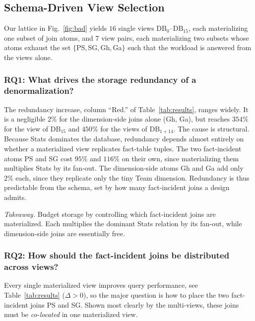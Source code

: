 \documentclass[sigconf]{acmart}
\begin{document}
\subsection{Schema-Driven View Selection}
\label{sec:exp:analysis}

Our lattice in Fig.~\ref{fig:bad} yields $16$ single views $\mathrm{DB}_0$--$\mathrm{DB}_{15}$, each materializing one subset of join atoms, and $7$ view pairs, each materializing two subsets whose atoms exhaust the set $\{$PS,\,SG,\,Gh,\,Ga$\}$ such that the workload is answered from the views alone.

\subsubsection{RQ1: What drives the storage redundancy of a denormalization?}
\label{sec:exp:rq1}
The redundancy increase, column ``Red.'' of Table~\ref{tab:results}, ranges widely. It is a negligible $2\%$ for the dimension-side joins alone (Gh, Ga), but reaches $354\%$ for the view of $\mathrm{DB}_{15}$ and $450\%$ for the views of $\mathrm{DB}_{1+14}$. The cause is structural. Because \textsf{Stats} dominates the database, redundancy depends almost entirely on whether a materialized view replicates fact-table tuples.
The two fact-incident atoms PS and SG cost $95\%$ and $116\%$ on their own, since materializing them multiplies \textsf{Stats} by its fan-out. The dimension-side atoms Gh and Ga add only $2\%$ each, since they replicate only the tiny \textsf{Team} dimension.
Redundancy is thus predictable from the schema, set by how many fact-incident joins a design admits.

\noindent\emph{Takeaway.} Budget storage by controlling which fact-incident joins are materialized. Each multiplies the dominant \textsf{Stats} relation by its fan-out, while dimension-side joins are essentially free.

\subsubsection{RQ2: How should the fact-incident joins be distributed across views?}
\label{sec:exp:rq2}

Every single materialized view improves query performance, see Table~\ref{tab:results} ($\Delta>0$), so the major question is how to place the two fact-incident joins PS and SG. Shown most clearly by the multi-views, these joins must be \emph{co-located} in one materialized view.
\end{document}
